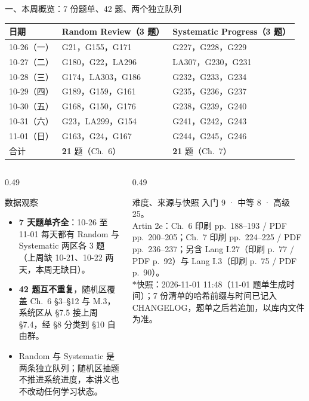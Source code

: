 \documentclass[aspectratio=169,10pt,fontset=none]{ctexbeamer}
\newcommand{\starpt}{\textcolor{accent}{\bfseries$\ast$}}
\begin{document}
\begin{frame}[t]{一、本周概览：7 份题单、42 题、两个独立队列}
  \label{sec:overview}
  \centering
  \scriptsize
  \setlength{\tabcolsep}{3pt}
  \renewcommand{\arraystretch}{1.14}
  \begin{tabular}{@{}l l l@{}}
    \toprule
    日期 & Random Review（3 题） & Systematic Progress（3 题）\\
    \midrule
    10-26（一） & G21，G155，G171 & G227，G228，G229\\
    10-27（二） & G180，G22，LA296 & LA307，G230，G231\\
    10-28（三） & G174，LA303，G186 & G232，G233，G234\\
    10-29（四） & G189，G159，G161 & G235，G236，G237\\
    10-30（五） & G168，G150，G176 & G238，G239，G240\\
    \rowcolor{ink!7} 10-31（六） & G23，LA299，G154 & G241，G242，G243\\
    \rowcolor{ink!7} 11-01（日） & G163，G24，G167 & G244，G245，G246\\
    \midrule
    合计 & \textbf{21} 题（Ch.~6） & \textbf{21} 题（Ch.~7）\\
    \bottomrule
  \end{tabular}
  \vspace{0.35em}
  \raggedright
  \begin{columns}[T,onlytextwidth]
    \begin{column}{0.49\textwidth}
      \begin{exampleblock}{\footnotesize 数据观察}
        \scriptsize
        \begin{itemize}\setlength{\itemsep}{1pt}
          \item \textbf{7 天题单齐全}：10-26 至 11-01 每天都有 Random 与 Systematic 两区各 3 题（上周缺 10-21、10-22 两天，本周无缺日）。
          \item \textbf{42 题互不重复}，随机区覆盖 Ch.~6 \S3--\S12 与 M.3，系统区从 \S7.5 接上周 \S7.4，经 \S8 分类到 \S10 自由群。
          \item Random 与 Systematic 是两条独立队列；随机区抽题不推进系统进度，本讲义也不改动任何学习状态。
        \end{itemize}
      \end{exampleblock}
    \end{column}
    \begin{column}{0.49\textwidth}
      \begin{block}{\footnotesize 难度、来源与快照}
        \scriptsize
        入门 9 · 中等 8 · 高级 25。\\
        Artin 2e：Ch.~6 印刷 pp.~188--193 / PDF pp.~200--205；Ch.~7 印刷 pp.~224--225 / PDF pp.~236--237；另含 Lang I.27（印刷 p.~77 / PDF p.~92）与 Lang I.3（印刷 p.~75 / PDF p.~90）。\\[1pt]
        \starpt 快照：2026-11-01 11:48（11-01 题单生成时间）；7 份清单的哈希前缀与时间已记入 CHANGELOG，题单之后若追加，以库内文件为准。
      \end{block}
    \end{column}
  \end{columns}
\end{frame}
\end{document}
